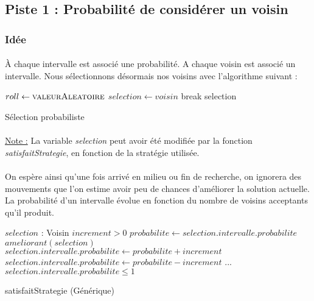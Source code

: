 \documentclass[a4paper,10pt]{report}
\begin{document}
\subsection{Piste 1 : Probabilité de considérer un voisin}
\subsubsection{Idée}

\paragraph{}
À chaque intervalle est associé une probabilité. A chaque voisin est associé un
intervalle. Nous sélectionnons désormais nos voisins avec l'algorithme suivant :

\begin{algorithm}[h]
  \begin{algorithmic}
      \State $roll\gets \Call{valeurAleatoire}{}$
	\State $selection \gets voisin$
	\State break
      \EndIf
    \EndFor
      \Return selection
    \EndIf
  \end{algorithmic}
  \caption{Sélection probabiliste}
\end{algorithm}

\paragraph{}
\underline{Note :} La variable \textit{selection} peut avoir été modifiée par la
fonction \textit{satisfaitStrategie}, en fonction de la stratégie utilisée.

\paragraph{}
  On espère ainsi qu'une fois arrivé en milieu ou fin de recherche, on ignorera
des mouvements que l'on estime avoir peu de chances d'améliorer la solution
actuelle. La probabilité d'un intervalle évolue en fonction du nombre de voisins
acceptants qu'il produit.

\pagebreak
\begin{algorithm}[h]
  \begin{algorithmic}
    \Require $selection$ : Voisin
    \Require $increment > 0$
    \State 
    \State $probabilite \gets selection.intervalle.probabilite$
    \If $ameliorant(selection)$
      \State $selection.intervalle.probabilite \gets probabilite + increment$
    \Else
      \State $selection.intervalle.probabilite \gets probabilite - increment$
    \EndIf
    \State ...
    \Ensure $selection.intervalle.probabilite \leq 1$
  \end{algorithmic}
  \caption{satisfaitStrategie (Générique)}
\end{algorithm}
\end{document}
